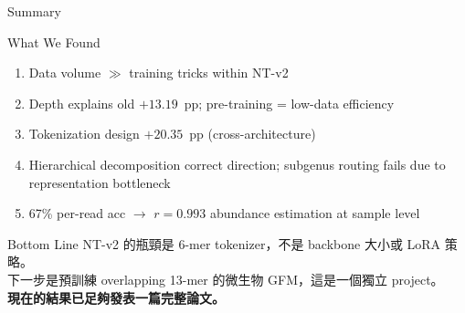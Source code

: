 \documentclass[aspectratio=169,12pt]{beamer}
\begin{document}
\begin{frame}{Summary}
\begin{block}{What We Found}
\begin{enumerate}
  \item Data volume $\gg$ training tricks within NT-v2
  \item Depth explains old $+13.19$~pp; pre-training = low-data efficiency
  \item Tokenization design $+20.35$~pp (cross-architecture)
  \item Hierarchical decomposition correct direction; subgenus routing fails due to representation bottleneck
  \item 67\% per-read acc $\to$ $r=0.993$ abundance estimation at sample level
\end{enumerate}
\end{block}

\begin{alertblock}{Bottom Line}
NT-v2 的瓶頸是 6-mer tokenizer，不是 backbone 大小或 LoRA 策略。\\
下一步是預訓練 overlapping 13-mer 的微生物 GFM，這是一個獨立 project。\\
\textbf{現在的結果已足夠發表一篇完整論文。}
\end{alertblock}
\end{frame}

\end{document}
